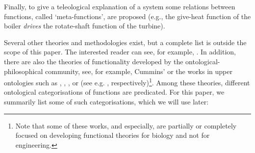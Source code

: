 \documentclass[
]{ceurart}
\begin{document}
\begin{itemize}
    Finally, to give a teleological explanation of a system some relations between functions, called `meta-functions', are proposed (e.g., the give-heat function of the boiler \textit{drives} the rotate-shaft function of the turbine). 
\end{itemize}

Several other theories and methodologies exist, but a complete list is outside the scope of this paper. The interested reader can see, for example, \cite{umedaFunctionBehaviourStructure1990,qianFunctionBehaviorStructure1996, zhaoStateBehaviorFunction2019}.
In addition, there are also the theories of functionality developed by the ontological-philosophical community, see, for example, Cummins'\cite{cumminsFunctionalAnalysis1975} or the works in upper ontologies such as \BFO, \GFO, \YAMATO, or \DOLCE (see e.g. \cite{spearFunctionsBasicFormal2016, herreGeneralFormalOntology2006, sasajimaFBRLFunctionBehavior1995, borgoFormalOntologicalPerspective2009}, respectively)\footnote{Note that some of these works, \BFO and \GFO especially, are partially or completely focused on developing functional theories for biology and not for engineering.}.
Among these theories, different ontological categorisations of functions are predicated. 
For this paper, we summarily list some of such categorisations, which we will use later:
\end{document}

